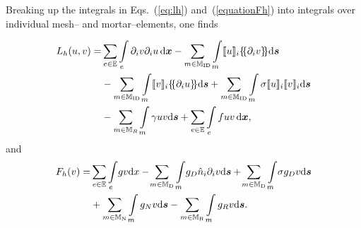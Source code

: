 Breaking up the integrals in Eqs.~(\ref{eq:lh}) and~(\ref{equationFh}) into integrals over individual mesh-- and
mortar--elements, one finds

\begin{align} 
  \label{eq:lh2}
 \nonumber
 L_h(u,v)
 =&
 \sum_{e\in\mathbb{E}}\int\displaylimits_{e}  \partial_i v\partial_i u \,\mathrm{d}\tv{x}
 - \sum_{m \in \mathbb{M}_{\rm ID}}\int\displaylimits_m \llbracket u \rrbracket_i \dgal*{\partial_i v}\mathrm{d}\tv s \\ \nonumber
 &
 - \sum_{m \in \mathbb{M}_{\rm ID}}\int\displaylimits_m \llbracket v \rrbracket_i \dgal*{\partial_i u} \mathrm{d}\tv s  
 +\sum_{m \in \mathbb{M}_{\rm ID}}\int\displaylimits_m\sigma \llbracket u \rrbracket_i \llbracket v \rrbracket_i \mathrm{d}\tv s \\ & -\sum_{m \in \mathbb{M}_{R}}\int\displaylimits_m\gamma u v \mathrm{d}\tv s 
 + \sum_{e\in\mathbb{E}}\int\displaylimits_{e}f u v \,\mathrm{d}\tv{x},
\end{align}
%
and
%
\begin{align}
  \label{equationFh2}
\nonumber
F_h(v)
=& \sum_{e\in\mathbb{E}}\int\displaylimits_{e}\! gv \mathrm{d}x
- \!\sum_{m \in \mathbb{M}_{\rm D}}\int\displaylimits_m \!g_D \hat n_i \partial_i v \mathrm{d}\boldsymbol{s}
+\! \sum_{m \in \mathbb{M}_{\rm D}}\int\displaylimits_m\! \sigma g_D v \mathrm{d}\boldsymbol{s} \\
  &+
\sum_{m \in \mathbb{M}_{\rm N}}\int\displaylimits_m g_Nv\mathrm{d}\boldsymbol{s} - \sum_{m \in \mathbb{M}_{\rm R}}\int\displaylimits_m g_Rv\mathrm{d}\boldsymbol{s}.
\end{align}

